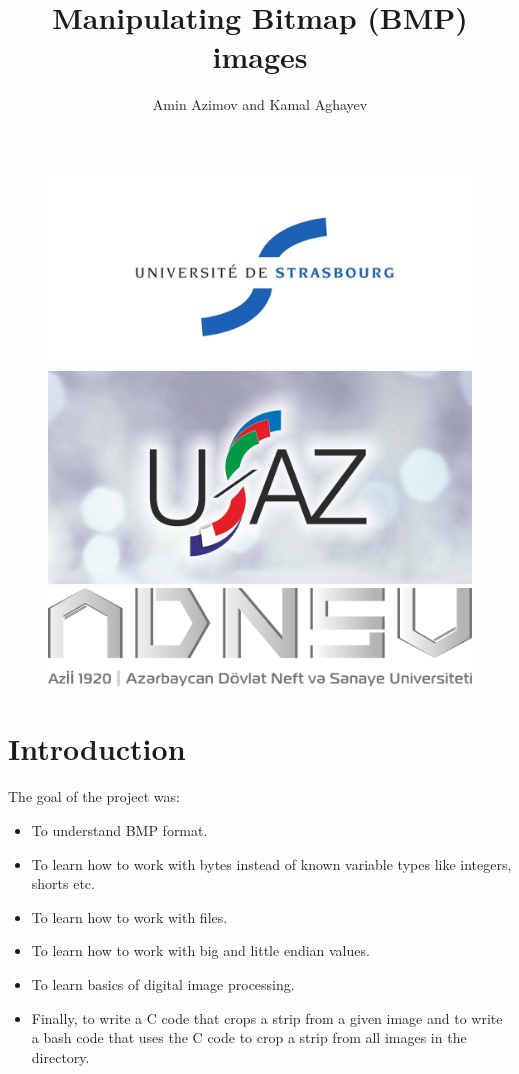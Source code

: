 \documentclass[a4paper]{article}
\title{Manipulating Bitmap (BMP) images}
\author{Amin Azimov and Kamal Aghayev}
\begin{document}
\begin{figure}[t]
\centering
\begin{minipage}{.3\textwidth}
  \centering
  \includegraphics[height=.4\linewidth]{unistra.jpg}
\end{minipage}
\begin{minipage}{.3\textwidth}
  \centering
  \includegraphics[height=.3\linewidth]{ufaz.jpg}
\end{minipage}
\begin{minipage}{.3\textwidth}
  \centering
  \includegraphics[height=.2\linewidth]{asoiu.png}
\end{minipage}
\end{figure}

\maketitle

\section{Introduction}

The goal of the project was:
\begin{itemize}
\item To understand BMP format.
\item To learn how to work with bytes instead of known variable types like integers, shorts etc.
\item To learn how to work with files.
\item To learn how to work with big and little endian values.
\item To learn basics of digital image processing.
\item Finally, to write a C code that crops a strip from a given image and to write a bash code that uses the C code to crop a strip from all images in the directory.
\end{itemize}
\end{document}
